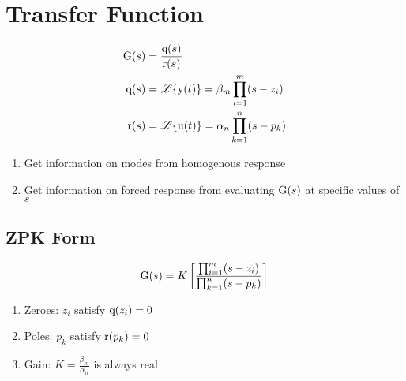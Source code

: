 \section*{Transfer Function}
\begin{align*}
    \func{G}[s] &= \frac{\func{q}[s]}{\func{r}[s]} \\
    \func{q}[s] &= \laplace{\func{y}[t]} = \beta_m \prod_{i=1}^{m}(s-z_i) \\
    \func{r}[s] &= \laplace{\func{u}[t]} = \alpha_n \prod_{k=1}^{n}(s-p_k)
\end{align*}
\begin{enumerate}
    \item Get information on modes from homogenous response
    \item Get information on forced response from evaluating \( \func{G}[s] \) at specific values of \( s \)
\end{enumerate}

\subsection*{ZPK Form}
\[
    \func{G}[s] = K \left[\frac{\prod_{i=1}^{m}(s-z_i)}{\prod_{k=1}^{n}(s-p_k)}\right]
\]
\begin{enumerate}
    \item Zeroes: \( z_i \) satisfy \( \func{q}[z_i] = 0 \)
    \item Poles: \( p_k \) satisfy \( \func{r}[p_k] = 0 \)
    \item Gain: \( K = \frac{\beta_m}{\alpha_n} \) is always real
\end{enumerate}